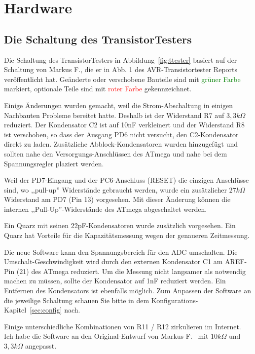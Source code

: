 \chapter{Hardware}

\section{Die Schaltung des TransistorTesters}
\label{sec:hardware}
Die Schaltung des TransistorTesters in Abbildung~\ref{fig:ttester} basiert auf der Schaltung von
Markus F., die er in Abb. 1 des AVR-Transistortester Reports \cite{Frejek} veröffentlicht hat.
Geänderte oder verschobene Bauteile sind mit \textcolor{green}{grüner Farbe} markiert, optionale Teile sind
mit \textcolor{red}{roter Farbe} gekennzeichnet.

Einige Änderungen wurden gemacht, weil die Strom-Abschaltung in einigen Nachbauten Probleme
bereitet hatte.
Deshalb ist der Widerstand R7 auf \(3,3k\Omega\) reduziert. 
Der Kondensator C2 ist auf 10nF verkleinert und der Widerstand R8 ist verschoben, so dass der
Ausgang PD6 nicht versucht, den C2-Kondensator direkt zu laden.
Zusätzliche Abblock-Kondensatoren wurden hinzugefügt und sollten nahe den Versorgungs-Anschlüssen
des ATmega und nahe bei dem Spannungsregler plaziert werden.

Weil der PD7-Eingang und der PC6-Anschluss (RESET) die einzigen Anschlüsse sind, wo
,,pull-up'' Widerstände gebraucht werden, wurde ein zusätzlicher \(27k\Omega\) Widerstand am PD7 (Pin 13) vorgesehen.
Mit dieser Änderung können die internen ,,Pull-Up''-Widerstände des ATmega abgeschaltet werden.

Ein Quarz mit seinen 22pF-Kondensatoren wurde zusätzlich vorgesehen.
Ein Quarz hat Vorteile für die Kapazitätsmessung wegen der genaueren Zeitmessung.

Die neue Software kann den Spannungsbereich für den ADC umschalten. Die Um\-schalt-Ge\-schwin\-dig\-keit
wird durch den externen Kondensator C1 am AREF-Pin (21) des ATmega reduziert.
Um die Messung nicht langsamer als notwendig machen zu müssen, sollte der Kondensator auf
1nF reduziert werden. Ein Entfernen des Kondensators ist ebenfalls möglich.
Zum Anpassen der Software an die jeweilige Schaltung schauen Sie bitte in dem
Kon\-fi\-gura\-tions-Kapitel~\ref{sec:config} nach. 

Einige unterschiedliche Kombinationen von R11 / R12 zirkulieren im Internet.
Ich habe die Software an den Original-Entwurf von Markus F.~\cite{Frejek} mit \(10k\Omega\) und \(3,3k\Omega\) angepasst.

